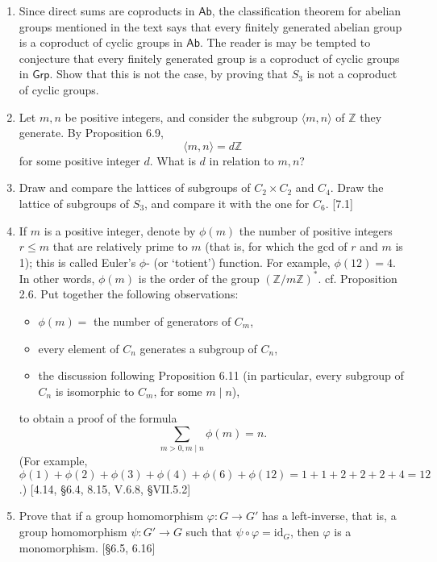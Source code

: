 \begin{enumerate}
    \item Since direct sums are coproducts in $\mathsf{Ab}$, the classification theorem for abelian groups mentioned in the text says that every finitely generated abelian group is a coproduct of cyclic groups in $\mathsf{Ab}$. The reader is may be tempted to conjecture that every finitely generated group is a coproduct of cyclic groups in $\mathsf{Grp}$. Show that this is not the case, by proving that $S_3$ is not a coproduct of cyclic groups.

    \item Let $m, n$ be positive integers, and consider the subgroup $\langle m, n \rangle$ of $\mathbb{Z}$ they generate. By Proposition 6.9,
          \[ \langle m, n \rangle = d\mathbb{Z} \]
          for some positive integer $d$. What is $d$ in relation to $m, n$?

    \item Draw and compare the lattices of subgroups of $C_2 \times C_2$ and $C_4$. Draw the lattice of subgroups of $S_3$, and compare it with the one for $C_6$. [7.1]

    \item If $m$ is a positive integer, denote by $\phi(m)$ the number of positive integers $r \le m$ that are relatively prime to $m$ (that is, for which the $\text{gcd}$ of $r$ and $m$ is 1); this is called Euler's $\phi$- (or `totient') function. For example, $\phi(12)=4$. In other words, $\phi(m)$ is the order of the group $(\mathbb{Z}/m\mathbb{Z})^*$. cf. Proposition 2.6.
          Put together the following observations:
          \begin{itemize}
              \item $\phi(m) = $ the number of generators of $C_m$,
              \item every element of $C_n$ generates a subgroup of $C_n$,
              \item the discussion following Proposition 6.11 (in particular, every subgroup of $C_n$ is isomorphic to $C_m$, for some $m \mid n$),
          \end{itemize}
          to obtain a proof of the formula
          \[ \sum_{m>0, m \mid n} \phi(m) = n. \]
          (For example, $\phi(1)+\phi(2)+\phi(3)+\phi(4)+\phi(6)+\phi(12) = 1+1+2+2+2+4 = 12$.) [4.14, \S6.4, 8.15, V.6.8, \S VII.5.2]

    \item Prove that if a group homomorphism $\varphi: G \to G'$ has a left-inverse, that is, a group homomorphism $\psi: G' \to G$ such that $\psi \circ \varphi = \text{id}_G$, then $\varphi$ is a monomorphism. [\S6.5, 6.16]


\end{enumerate}
